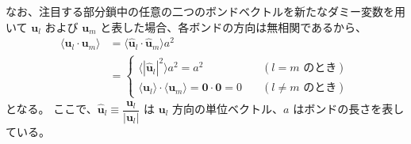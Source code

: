 \documentclass[uplatex,dvipdfmx,a4paper,11pt]{jsarticle}
\begin{document}
なお、注目する部分鎖中の任意の二つのボンドベクトルを新たなダミー変数を用いて $\bm{u}_l$ および $\bm{u}_m$ と表した場合、各ボンドの方向は無相関であるから、
\begin{align*}
\langle \bm{u}_l \cdot \bm{u}_m \rangle 
	&= \langle \bm{\hat{u}}_l \cdot \bm{\hat{u}}_m \rangle a^2 \\
	&=
\begin{cases}
\langle |\bm{\hat{u}}_l |^2 \rangle a^2 = a^2	&\quad (\text{$l = m$ のとき}) \\
\langle \bm{u}_l \rangle \cdot \langle \bm{u}_m \rangle = \bm{0}\cdot\bm{0} = 0	&\quad(\text{$l \neq m$ のとき})
\end{cases}
\end{align*}
となる。
ここで、$\bm{\hat{u}}_l \equiv \dfrac{\bm{u}_l}{|\bm{u}_l|}$ は $\bm{u}_l$ 方向の単位ベクトル、$a$ はボンドの長さを表している。
%
%
%
%
\end{document}
